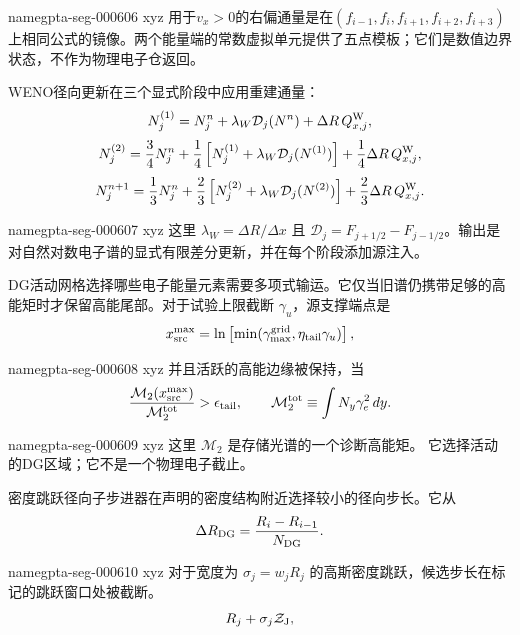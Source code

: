\documentclass[twocolumn]{aastex702}
\makeatletter
\providecommand{\gptareaderanchor}[1]{\pdfdest name{#1} xyz}%
\providecommand{\gptareaderanchor}[1]{\special{pdf:dest (#1) [ @thispage /XYZ @xpos @ypos null ]}}%
\makeatother
\begin{document}
\gptareaderanchor{gpta-seg-000606}%
用于\(v_x>0\)的右偏通量是在\((f_{i-1},f_i,f_{i+1},f_{i+2},f_{i+3})\)上相同公式的镜像。两个能量端的常数虚拟单元提供了五点模板；它们是数值边界状态，不作为物理电子仓返回。

WENO径向更新在三个显式阶段中应用重建通量：
\begin{equation}
N_j^{(1)}=N_j^n+\lambda_W\mathcal{D}_j(N^n)+\Delta R\,Q_{x,j}^{\rm W},
\end{equation}
\begin{equation}
N_j^{(2)}=\frac{3}{4}N_j^n+
\frac{1}{4}\left[N_j^{(1)}+
\lambda_W\mathcal{D}_j(N^{(1)})\right]
+\frac{1}{4}\Delta R\,Q_{x,j}^{\rm W},
\end{equation}
\begin{equation}
N_j^{n+1}=\frac{1}{3}N_j^n+
\frac{2}{3}\left[N_j^{(2)}+
\lambda_W\mathcal{D}_j(N^{(2)})\right]
+\frac{2}{3}\Delta R\,Q_{x,j}^{\rm W}.
\end{equation}

\gptareaderanchor{gpta-seg-000607}%
这里 \(\lambda_W=\Delta R/\Delta x\) 且 \(\mathcal D_j=F_{j+1/2}-F_{j-1/2}\)。输出是对自然对数电子谱的显式有限差分更新，并在每个阶段添加源注入。

DG活动网格选择哪些电子能量元素需要多项式输运。它仅当旧谱仍携带足够的高能矩时才保留高能尾部。对于试验上限截断 \(\gamma_u\)，源支撑端点是
\begin{equation}
x_{\rm src}^{\max}=
\ln\left[\min(\gamma_{\max}^{\rm grid},\eta_{\rm tail}\gamma_u)\right],
\end{equation}

\gptareaderanchor{gpta-seg-000608}%
并且活跃的高能边缘被保持，当
\begin{equation}
\frac{\mathcal{M}_2(x_{\rm src}^{\max})}{\mathcal{M}_2^{\rm tot}}
>\epsilon_{\rm tail},
\qquad
\mathcal{M}_2^{\rm tot}\equiv\int N_y\gamma_e^2\,dy .
\end{equation}

\gptareaderanchor{gpta-seg-000609}%
这里 \(\mathcal M_2\) 是存储光谱的一个诊断高能矩。
它选择活动的DG区域；它不是一个物理电子截止。

密度跳跃径向子步进器在声明的密度结构附近选择较小的径向步长。它从
\begin{equation}
\Delta R_{\rm DG}=\frac{R_i-R_{i-1}}{N_{\rm DG}}.
\end{equation}

\gptareaderanchor{gpta-seg-000610}%
对于宽度为 \(\sigma_j=w_jR_j\) 的高斯密度跳跃，候选步长在标记的跳跃窗口处被截断。
\begin{equation}
R_j+\sigma_j\mathcal{Z}_{\rm J},
\end{equation}
\end{document}

